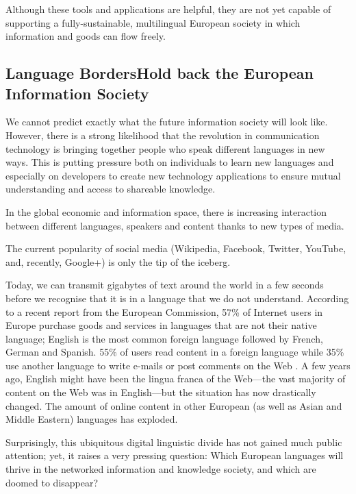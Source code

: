 \documentclass[]{../../metanetpaper}
\begin{document}
\begin{multicols}{2}
Although these tools and applications are helpful, they are not yet capable of supporting a fully-sustainable, multilingual European society in which information and goods can flow freely.

\subsection[Language Borders Hold back the European Information Society]{Language Borders\newline Hold back the European Information Society}

We cannot predict exactly what the future information society will look like. However, there is a strong likelihood that the revolution in communication technology is bringing together people who speak different languages in new ways. This is putting pressure both on individuals to learn new languages and especially on developers to create new technology applications to ensure mutual understanding and access to shareable knowledge. 

In the global economic and information space, there is increasing interaction between different languages, speakers and content thanks to new types of media. 

The current popularity of social media (Wikipedia, Facebook, Twitter, YouTube, and, recently, Google+) is only the tip of the iceberg.


Today, we can transmit gigabytes of text around the world in a few seconds before we recognise that it is in a language that we do not understand. According to a recent report from the European Commission, 57\% of Internet users in Europe purchase goods and services in languages that are not their native language; English is the most common foreign language followed by French, German and Spanish. 55\% of users read content in a foreign language while 35\% use another language to write e-mails or post comments on the Web \cite{EC1}. A few years ago, English might have been the lingua franca of the Web—the vast majority of content on the Web was in English—but the situation has now drastically changed. The amount of online content in other European (as well as Asian and Middle Eastern) languages has exploded.

Surprisingly, this ubiquitous digital linguistic divide has not gained much public attention; yet, it raises a very pressing question: Which European languages will thrive in the networked information and knowledge society, and which are doomed to disappear?


\end{multicols}
\end{document}
